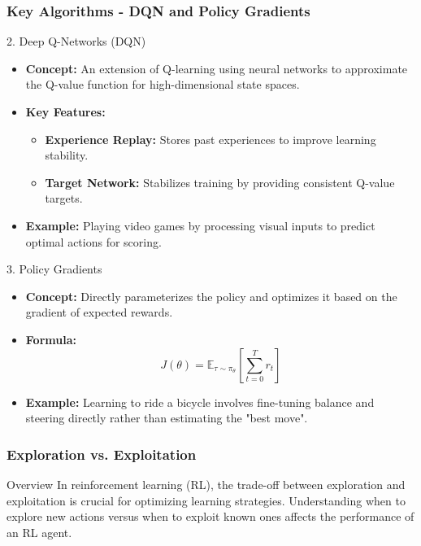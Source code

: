 \documentclass[aspectratio=169]{beamer}
\begin{document}
\begin{frame}[fragile]
    \frametitle{Key Algorithms - DQN and Policy Gradients}
    \begin{block}{2. Deep Q-Networks (DQN)}
        \begin{itemize}
            \item \textbf{Concept:} An extension of Q-learning using neural networks to approximate the Q-value function for high-dimensional state spaces.
            \item \textbf{Key Features:}
            \begin{itemize}
                \item \textbf{Experience Replay:} Stores past experiences to improve learning stability.
                \item \textbf{Target Network:} Stabilizes training by providing consistent Q-value targets.
            \end{itemize}
            \item \textbf{Example:} Playing video games by processing visual inputs to predict optimal actions for scoring.
        \end{itemize}
    \end{block}
    
    \begin{block}{3. Policy Gradients}
        \begin{itemize}
            \item \textbf{Concept:} Directly parameterizes the policy and optimizes it based on the gradient of expected rewards.
            \item \textbf{Formula:}
            \begin{equation}
                J(\theta) = \mathbb{E}_{\tau \sim \pi_\theta} \left[ \sum_{t=0}^{T} r_t \right]
            \end{equation}
            \item \textbf{Example:} Learning to ride a bicycle involves fine-tuning balance and steering directly rather than estimating the "best move".
        \end{itemize}
    \end{block}
\end{frame}

\begin{frame}[fragile]
    \frametitle{Exploration vs. Exploitation}
    \begin{block}{Overview}
        In reinforcement learning (RL), the trade-off between exploration and exploitation is crucial for optimizing learning strategies. 
        Understanding when to explore new actions versus when to exploit known ones affects the performance of an RL agent.
    \end{block}
\end{frame}
\end{document}
